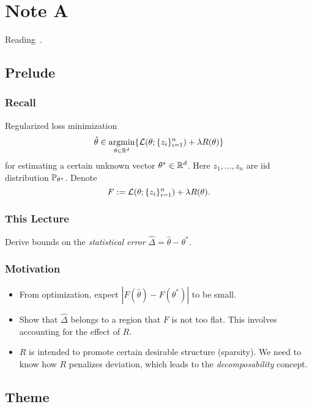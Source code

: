\section{Note A}
Reading~\cite{negahban2012}.
\subsection{Prelude}

\subsubsection{Recall}

Regularized loss minimization
\begin{equation}
\hat\theta \in \mathop{\mathrm{argmin}}_{\theta\in{\mathbb{R}}^d} \{\mathcal{L}(\theta;\{z_i\}_{i=1}^n) + \lambda R(\theta)\}
\end{equation}
for estimating a certain unknown vector $\theta^*\in{\mathbb{R}}^d$.
Here $z_1,\dots,z_n$ are iid \wrt distribution $\mathbb{P}_{\theta^*}$.
Denote
\begin{equation}
F := \mathcal{L}(\theta;\{z_i\}_{i=1}^n) + \lambda R(\theta).
\end{equation}

\subsubsection{This Lecture}

Derive bounds on the \emph{statistical error}
$\hat\Delta = \hat\theta - \theta^*$.

\subsubsection{Motivation}

\begin{itemize}
    \item From optimization, expect
        $|F(\hat\theta) - F(\theta^*)|$
        to be small.
    \item Show that $\hat\Delta$ belongs to a region
        that $F$ is not too flat.
        This involves accounting for the effect of $R$.
    \item $R$ is intended to promote certain desirable structure (\eg sparsity).
        We need to know how $R$ penalizes deviation,
        which leads to the \emph{decomposability} concept.
\end{itemize}

\subsection{Theme}

